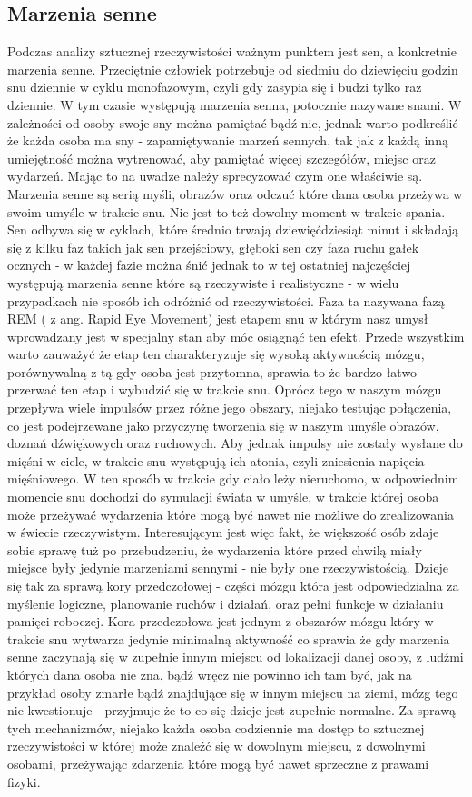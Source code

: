 	\subsection{Marzenia senne}
	\label{subsec:sny}
	Podczas analizy sztucznej rzeczywistości ważnym punktem jest sen, a konkretnie marzenia senne. Przeciętnie człowiek potrzebuje od siedmiu do dziewięciu godzin snu dziennie w cyklu monofazowym, czyli gdy zasypia się i budzi tylko raz dziennie. W tym czasie występują marzenia senna, potocznie nazywane snami. W zależności od osoby swoje sny można pamiętać bądź nie, jednak warto podkreślić że każda osoba ma sny - zapamiętywanie marzeń sennych, tak jak z każdą inną umiejętność można wytrenować, aby pamiętać więcej szczegółów, miejsc oraz wydarzeń. Mając to na uwadze należy sprecyzować czym one właściwie są. Marzenia senne są serią myśli, obrazów oraz odczuć które dana osoba przeżywa w swoim umyśle w trakcie snu. Nie jest to też dowolny moment w trakcie spania. Sen odbywa się w cyklach, które średnio trwają dziewięćdziesiąt minut i składają się z kilku faz takich jak sen przejściowy, głęboki sen czy faza ruchu gałek ocznych - w każdej fazie można śnić jednak to w tej ostatniej najczęściej występują marzenia senne które są rzeczywiste i realistyczne - w wielu przypadkach nie sposób ich odróżnić od rzeczywistości. Faza ta nazywana fazą REM ( z ang. Rapid Eye Movement) jest etapem snu w którym nasz umysł wprowadzany jest w specjalny stan aby móc osiągnąć ten efekt. Przede wszystkim warto zauważyć że etap ten charakteryzuje się wysoką aktywnością mózgu, porównywalną z tą gdy osoba jest przytomna, sprawia to że bardzo łatwo przerwać ten etap i wybudzić się w trakcie snu. Oprócz tego w naszym mózgu przepływa wiele impulsów przez różne jego obszary, niejako testując połączenia, co jest podejrzewane jako przyczynę tworzenia się w naszym umyśle obrazów, doznań dźwiękowych oraz ruchowych. Aby jednak impulsy nie zostały wysłane do mięśni w ciele, w trakcie snu występują ich atonia, czyli zniesienia napięcia mięśniowego. W ten sposób w trakcie gdy ciało leży nieruchomo, w odpowiednim momencie snu dochodzi do symulacji świata w umyśle, w trakcie której osoba może przeżywać wydarzenia które mogą być nawet nie możliwe do zrealizowania w świecie rzeczywistym. Interesującym jest więc fakt, że większość osób zdaje sobie sprawę tuż po przebudzeniu, że wydarzenia które przed chwilą miały miejsce były jedynie marzeniami sennymi - nie były one rzeczywistością. Dzieje się tak za sprawą kory przedczołowej - części mózgu która jest odpowiedzialna za myślenie logiczne, planowanie ruchów i działań, oraz pełni funkcje w działaniu pamięci roboczej. Kora przedczołowa jest jednym z obszarów mózgu który w trakcie snu wytwarza jedynie minimalną aktywność co sprawia że gdy marzenia senne zaczynają się w zupełnie innym miejscu od lokalizacji danej osoby, z ludźmi których dana osoba nie zna, bądź wręcz nie powinno ich tam być, jak na przykład osoby zmarłe bądź znajdujące się w innym miejscu na ziemi, mózg tego nie kwestionuje - przyjmuje że to co się dzieje jest zupełnie normalne. Za sprawą tych mechanizmów, niejako każda osoba codziennie ma dostęp to sztucznej rzeczywistości w której może znaleźć się w dowolnym miejscu, z dowolnymi osobami, przeżywając zdarzenia które mogą być nawet sprzeczne z prawami fizyki. 
	

